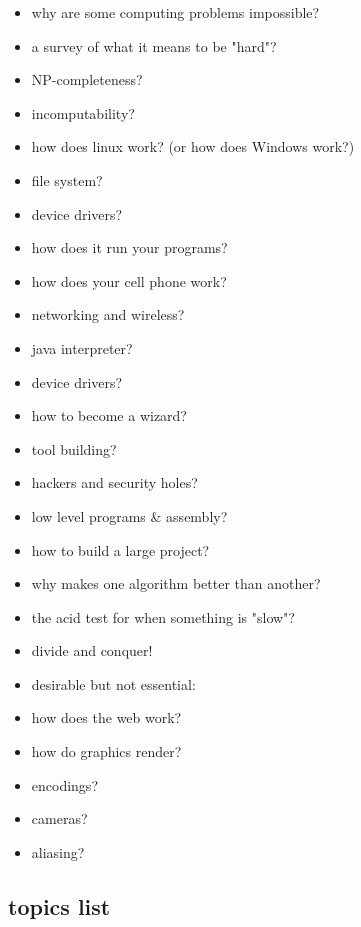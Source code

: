 \documentclass[draft]{article}
\begin{document}
\begin{itemize}
\item why are some computing problems impossible?
\item a survey of what it means to be "hard"?
\item NP-completeness?
\item incomputability?
\item how does linux work? (or how does Windows work?)
\item file system?
\item device drivers?
\item how does it run your programs?
\item how does your cell phone work?
\item networking and wireless?
\item java interpreter?
\item device drivers?
\item how to become a wizard?
\item tool building?
\item hackers and security holes?
\item low level programs \& assembly?
\item how to build a large project?
\item why makes one algorithm better than another?
\item the acid test for when something is "slow"?
\item divide and conquer!

\item desirable but not essential:
\item how does the web work?
\item how do graphics render?
\item encodings?
\item cameras?
\item aliasing?
\end{itemize}

\subsection{topics list}
\end{document}

